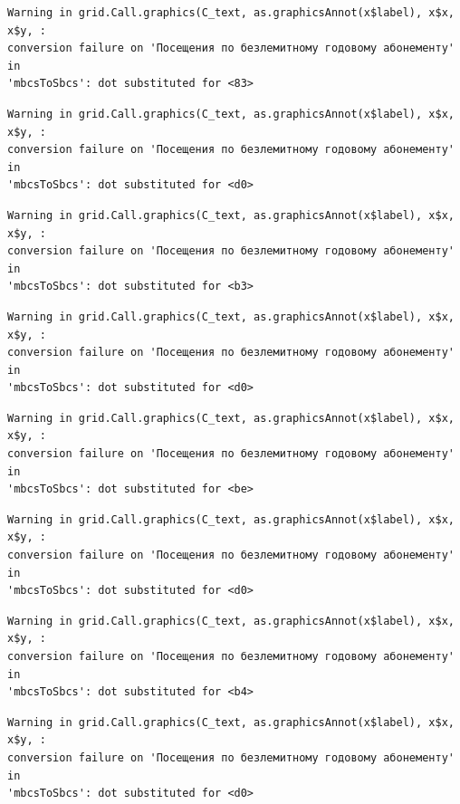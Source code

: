 \documentclass[
  letterpaper,
  DIV=11,
  numbers=noendperiod]{scrartcl}
\begin{document}
\begin{verbatim}
Warning in grid.Call.graphics(C_text, as.graphicsAnnot(x$label), x$x, x$y, :
conversion failure on 'Посещения по безлемитному годовому абонементу' in
'mbcsToSbcs': dot substituted for <83>
\end{verbatim}

\begin{verbatim}
Warning in grid.Call.graphics(C_text, as.graphicsAnnot(x$label), x$x, x$y, :
conversion failure on 'Посещения по безлемитному годовому абонементу' in
'mbcsToSbcs': dot substituted for <d0>
\end{verbatim}

\begin{verbatim}
Warning in grid.Call.graphics(C_text, as.graphicsAnnot(x$label), x$x, x$y, :
conversion failure on 'Посещения по безлемитному годовому абонементу' in
'mbcsToSbcs': dot substituted for <b3>
\end{verbatim}

\begin{verbatim}
Warning in grid.Call.graphics(C_text, as.graphicsAnnot(x$label), x$x, x$y, :
conversion failure on 'Посещения по безлемитному годовому абонементу' in
'mbcsToSbcs': dot substituted for <d0>
\end{verbatim}

\begin{verbatim}
Warning in grid.Call.graphics(C_text, as.graphicsAnnot(x$label), x$x, x$y, :
conversion failure on 'Посещения по безлемитному годовому абонементу' in
'mbcsToSbcs': dot substituted for <be>
\end{verbatim}

\begin{verbatim}
Warning in grid.Call.graphics(C_text, as.graphicsAnnot(x$label), x$x, x$y, :
conversion failure on 'Посещения по безлемитному годовому абонементу' in
'mbcsToSbcs': dot substituted for <d0>
\end{verbatim}

\begin{verbatim}
Warning in grid.Call.graphics(C_text, as.graphicsAnnot(x$label), x$x, x$y, :
conversion failure on 'Посещения по безлемитному годовому абонементу' in
'mbcsToSbcs': dot substituted for <b4>
\end{verbatim}

\begin{verbatim}
Warning in grid.Call.graphics(C_text, as.graphicsAnnot(x$label), x$x, x$y, :
conversion failure on 'Посещения по безлемитному годовому абонементу' in
'mbcsToSbcs': dot substituted for <d0>
\end{verbatim}
\end{document}
